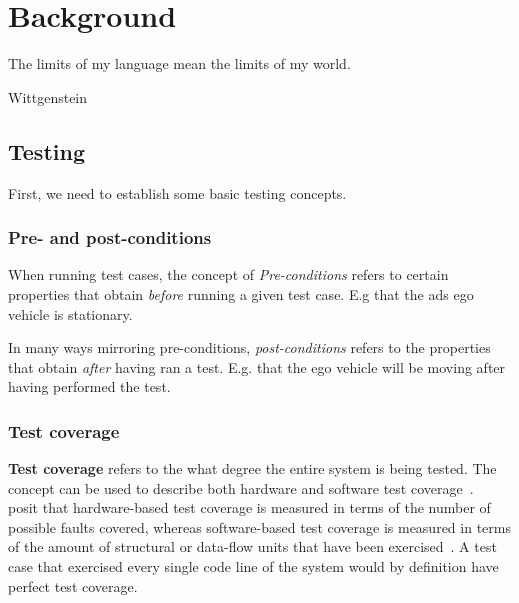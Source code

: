 \chapter{Background}\label{sec:background}

\epigraph{The limits of my language mean the limits of my world.}{Wittgenstein}

\section{Testing}

First, we need to establish some basic testing concepts.

\subsection{Pre- and post-conditions}\label{sec:testingConditions}

When running test cases, the concept of \textit{Pre-conditions}
refers to certain properties that
obtain \textit{before} running a given test case. E.g that the \acrshort{ads} ego vehicle is
stationary.

In many ways mirroring pre-conditions, \textit{post-conditions} refers to the properties that obtain
\textit{after} having ran a test. E.g. that the ego vehicle will be moving after having performed
the test.


\subsection{Test coverage}\label{sec:testCoverage}

\textbf{Test coverage} refers to the what degree the entire system is being tested. The concept can
be used to describe both hardware and software test
coverage~\cite[187]{testCoverage94}.~\citeauthor{testCoverage94} posit that hardware-based test
coverage is measured in terms of the number of possible faults covered, whereas software-based test
coverage is measured in terms of the amount of structural or data-flow units that have been
exercised~\cite[187]{testCoverage94}. A test case that exercised every single code line of the
system would by definition have perfect test coverage.


% 

